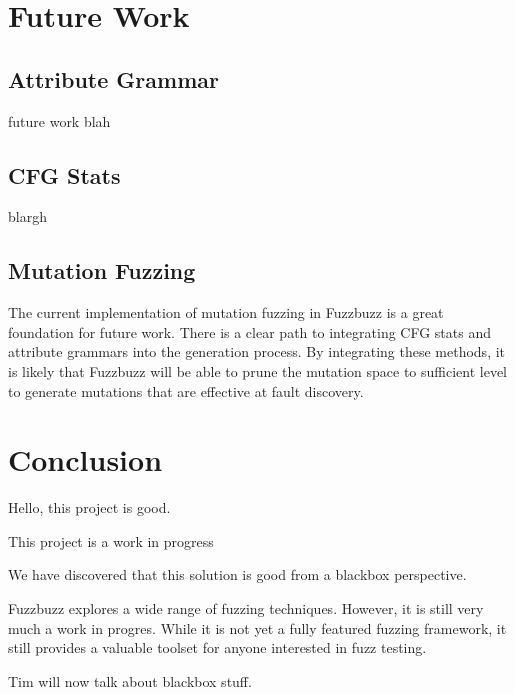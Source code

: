 \section{Future Work}
\subsection{Attribute Grammar}
future work blah
\subsection{CFG Stats}
blargh
\subsection{Mutation Fuzzing}
The current implementation of mutation fuzzing in Fuzzbuzz is a great
foundation for future work. There is a clear path to integrating CFG
stats and attribute grammars into the generation process. By
integrating these methods, it is likely that Fuzzbuzz will be able to
prune the mutation space to sufficient level to generate mutations
that are effective at fault discovery.

\section{Conclusion}
Hello, this project is good.

This project is a work in progress

We have discovered that this solution is good from a blackbox
perspective.



Fuzzbuzz explores a wide range of fuzzing techniques. However, it is
still very much a work in progres. While it is not yet a
fully featured fuzzing framework, it still provides a valuable toolset
for anyone interested in fuzz testing.

Tim will now talk about blackbox stuff.


